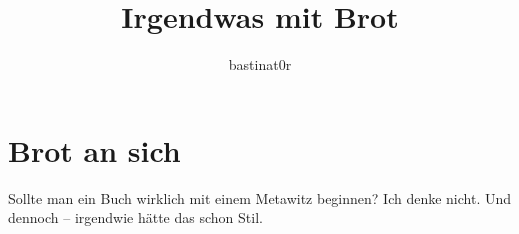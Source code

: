 \documentclass{book}
\title{Irgendwas mit Brot}
\author{bastinat0r}
\begin{document}
\maketitle

\chapter{Brot an sich}
Sollte man ein Buch wirklich mit einem Metawitz beginnen? Ich denke nicht. Und dennoch – irgendwie hätte das schon Stil.
\end{document}
